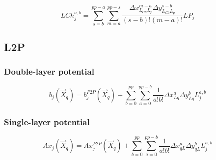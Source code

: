 \documentclass[letter,10pt]{article}
\begin{document}
\begin{equation}
LCh_j^{a,b}=\sum_{s=b}^{pp-a}\sum_{m=a}^{pp-s}\frac{\Delta x_{L_{Ch}L_p}^{m-a}\Delta y_{L_{Ch}L_p}^{s-b}}{(s-b)!(m-a)!}LP_j
\end{equation}

\subsection{L2P}

\subsubsection{Double-layer potential}

\begin{equation}
b_j(\vec{X}_q) = b_j^{P2P}(\vec{X}_q) + \sum_{b=0}^{pp}\sum_{a=0}^{pp-b} \frac{1}{a!b!}\Delta x_{Lq}^a \Delta y_{Lq}^bL_j^{a,b}
\end{equation}

\subsubsection{Single-layer potential}

\begin{equation}
Ax_j(\vec{X}_q) = Ax_j^{P2P}(\vec{X}_q) + \sum_{b=0}^{pp}\sum_{a=0}^{pp-b} \frac{1}{a!b!}\Delta x_{qL}^a \Delta y_{qL}^bL_j^{a,b}
\end{equation}
\end{document}
